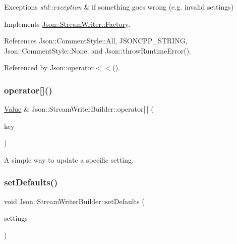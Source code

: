 \begin{DoxyExceptions}{Exceptions}
{\em std\+::exception} & if something goes wrong (e.\+g. invalid settings) \\
\hline
\end{DoxyExceptions}


Implements \hyperlink{classJson_1_1StreamWriter_1_1Factory_a9d30ec53e8288cd53befccf1009c5f31_a9d30ec53e8288cd53befccf1009c5f31}{Json\+::\+Stream\+Writer\+::\+Factory}.



References Json\+::\+Comment\+Style\+::\+All, J\+S\+O\+N\+C\+P\+P\+\_\+\+S\+T\+R\+I\+NG, Json\+::\+Comment\+Style\+::\+None, and Json\+::throw\+Runtime\+Error().



Referenced by Json\+::operator$<$$<$().

\mbox{\label{classJson_1_1StreamWriterBuilder_af68f6b59cb20b074052ed12bb3d336a3_af68f6b59cb20b074052ed12bb3d336a3}} 
\subsubsection{\texorpdfstring{operator[]()}{operator[]()}}
{\footnotesize\ttfamily \hyperlink{classJson_1_1Value}{Value} \& Json\+::\+Stream\+Writer\+Builder\+::operator\mbox{[}$\,$\mbox{]} (\begin{DoxyParamCaption}\item[{\hyperlink{json_8h_a1e723f95759de062585bc4a8fd3fa4be_a1e723f95759de062585bc4a8fd3fa4be}{J\+S\+O\+N\+C\+P\+P\+\_\+\+S\+T\+R\+I\+NG}}]{key }\end{DoxyParamCaption})}

A simple way to update a specific setting. \mbox{\label{classJson_1_1StreamWriterBuilder_a53bf106b141e28637b01ad0ecd2acbf6_a53bf106b141e28637b01ad0ecd2acbf6}} 
\subsubsection{\texorpdfstring{set\+Defaults()}{setDefaults()}}
{\footnotesize\ttfamily void Json\+::\+Stream\+Writer\+Builder\+::set\+Defaults (\begin{DoxyParamCaption}\item[{\hyperlink{classJson_1_1Value}{Json\+::\+Value} $\ast$}]{settings }\end{DoxyParamCaption})\hspace{0.3cm}{\ttfamily [static]}}


